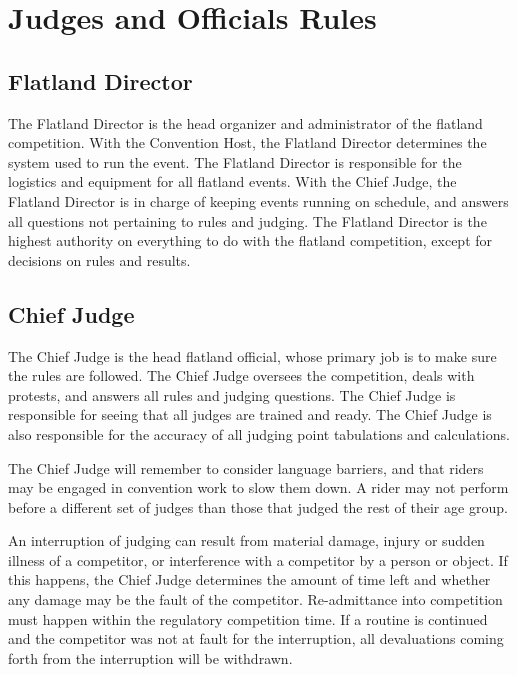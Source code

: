 \chapter{Judges and Officials Rules}

\section{Flatland Director}

The Flatland Director is the head organizer and administrator of the flatland competition.
With the Convention Host, the Flatland Director determines the system used to run the event.
The Flatland Director is responsible for the logistics and equipment for all flatland events.
With the Chief Judge, the Flatland Director is in charge of keeping events running on schedule, and answers all questions not pertaining to rules and judging.
The Flatland Director is the highest authority on everything to do with the flatland competition, except for decisions on rules and results.

\section{Chief Judge}

The Chief Judge is the head flatland official, whose primary job is to make sure the rules are followed.
The Chief Judge oversees the competition, deals with protests, and answers all rules and judging questions.
The Chief Judge is responsible for seeing that all judges are trained and ready.
The Chief Judge is also responsible for the accuracy of all judging point tabulations and calculations.


The Chief Judge will remember to consider language barriers, and that riders may be engaged in convention work to slow them down.
A rider may not perform before a different set of judges than those that judged the rest of their age group.

An interruption of judging can result from material damage, injury or sudden illness of a competitor, or interference with a competitor by a person or object.
If this happens, the Chief Judge determines the amount of time left and whether any damage may be the fault of the competitor.
Re-admittance into competition must happen within the regulatory competition time.
If a routine is continued and the competitor was not at fault for the interruption, all devaluations coming forth from the interruption will be withdrawn.

